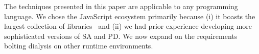 \documentclass[letterpaper,twocolumn,10pt]{article}
\newcommand{\ttiny}[1]{\texttt{\footnotesize #1}}
\begin{document}

The techniques presented in this paper are applicable to any programming language.
We chose the JavaScript ecosystem %
primarily because
  (i) it boasts the largest collection of libraries~\cite{modulecounts} and
	(ii) we had prior experience developing more sophisticated versions of SA and PD.
We now expand on the requirements bolting dialysis on other runtime environments.
\end{document}
